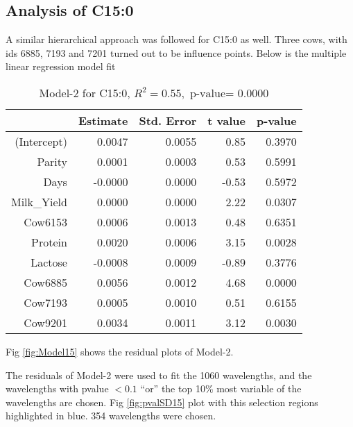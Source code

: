 \subsection*{Analysis of C15:0}
A similar hierarchical approach was followed for C15:0 as well. Three cows, with ids 6885, 7193 and 7201 turned out to be influence points. Below is the multiple linear regression model fit
\begin{table}[H]
\centering
\begin{tabular}{rrrrr}
  \hline
 & Estimate & Std. Error & t value & p-value \\ 
  \hline
  (Intercept) & 0.0047 & 0.0055 & 0.85 & 0.3970 \\ 
  Parity & 0.0001 & 0.0003 & 0.53 & 0.5991 \\ 
  Days & -0.0000 & 0.0000 & -0.53 & 0.5972 \\ 
  Milk\_Yield & 0.0000 & 0.0000 & 2.22 & 0.0307 \\ 
  Cow6153 & 0.0006 & 0.0013 & 0.48 & 0.6351 \\ 
  Protein & 0.0020 & 0.0006 & 3.15 & 0.0028 \\ 
  Lactose & -0.0008 & 0.0009 & -0.89 & 0.3776 \\ 
  Cow6885 & 0.0056 & 0.0012 & 4.68 & 0.0000 \\ 
  Cow7193 & 0.0005 & 0.0010 & 0.51 & 0.6155 \\ 
  Cow9201 & 0.0034 & 0.0011 & 3.12 & 0.0030 \\ 
  \hline
\end{tabular}
\caption{Model-2 for C15:0, $R^2 = 0.55, \text{ p-value= } 0.0000$}
\label{Tab:Model15}
\end{table}
Fig \ref{fig:Model15} shows the residual plots of Model-2.

The residuals of Model-2 were used to fit the 1060 wavelengths, and the wavelengths with pvalue $< 0.1$ ``or'' the top 10\% most variable of the wavelengths are chosen. Fig \ref{fig:pvalSD15} plot with this selection regions highlighted in blue. 354 wavelengths were chosen. 

